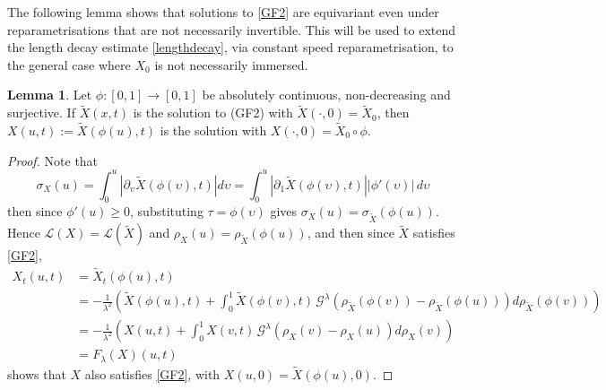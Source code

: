 \documentclass[a4paper,11pt]{amsart}
\theoremstyle{definition}\newtheorem*{definition}{Definition}
\theoremstyle{definition} \newtheorem{proposition}[theorem]{Proposition}
\theoremstyle{definition}\newtheorem{lemma}[theorem]{Lemma}
\theoremstyle{definition}\newtheorem{corollary}[theorem]{Corollary}
\theoremstyle{definition}\newtheorem{example}{Example}
\theoremstyle{remark}\newtheorem*{remark}{Remark}
\def\R{\mathbb{R}}
\def\S{\mathbb{S}}
\def\G{\mathcal G^\lambda}
\newcommand{\norm}[1]{{\left \Vert {#1}\right \Vert}}
\def\length{\mathcal L}
\begin{document}

The following lemma shows that solutions to \eqref{GF2} are equivariant even under reparametrisations that are not necessarily invertible. This will be used to extend the length decay estimate \eqref{lengthdecay}, via constant speed reparametrisation, to the general case where $X_0$ is not necessarily immersed. 


\begin{lemma}\label{reparam}
Let $\phi : [0,1] \to [0,1]$ be absolutely continuous, non-decreasing and surjective.
If $\tilde{X}(x,t)$ is the solution to (GF2) with $\tilde{X}(\cdot, 0) = \tilde{X}_0$, then
$X(u,t) := \tilde{X}(\phi(u), t)$ is the solution with $X(\cdot, 0) = \tilde{X}_0 \circ \phi$.
\end{lemma}

\begin{proof}
Note that
$$\sigma_X(u) = \int_0^u \left| \partial_\upsilon \tilde{X}(\phi(\upsilon ), t) \right| d\upsilon = \int_0^u \left| \partial_1 \tilde{X}(\phi(\upsilon ), t) \right| |\phi'(\upsilon )|\, d\upsilon $$
then since $\phi'(u) \geq 0$, substituting $\tau = \phi(\upsilon )$ gives $\sigma_X(u) = \sigma_{\tilde{X}}(\phi(u))$.
Hence $\mathcal{L}(X) = \mathcal{L}(\tilde{X})$ and $\rho_X(u) = \rho_{\tilde{X}}(\phi(u))$, and then since $\tilde X$ satisfies \eqref{GF2},
\begin{align*}
X_t(u,t) &= \tilde{X}_t(\phi(u), t) \\
&= -\frac{1}{\lambda^2} \left( \tilde{X}(\phi(u), t) + \int_0^1 \tilde{X}(\phi(v), t)\, \G\left( \rho_{\tilde{X}}(\phi(v)) - \rho_{\tilde{X}}(\phi(u)) \right) d \rho_{\tilde{X}}(\phi(v)) \right) \\
&= -\frac{1}{\lambda^2} \left( X(u,t) + \int_0^1 X(v,t)\, \G\left( \rho_X(v) - \rho_X(u) \right) d \rho_X(v) \right) \\
&= F_\lambda (X)(u,t)
\end{align*}
shows that $X$ also satisfies \eqref{GF2}, with $X(u,0)=\tilde X(\phi(u),0)$.
\end{proof}
\end{document}
